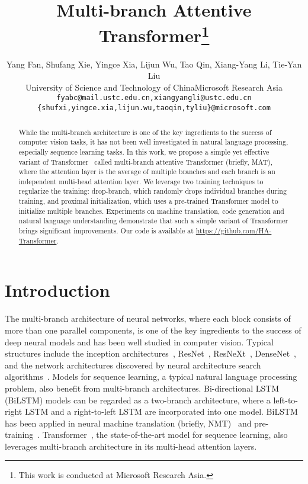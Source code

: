\documentclass{article}
\title{Multi-branch Attentive Transformer\thanks{This work is conducted at Microsoft Research Asia.}}
\author{Yang Fan, Shufang Xie, Yingce Xia, Lijun Wu, Tao Qin, Xiang{-}Yang Li, Tie{-}Yan Liu\\
 University of Science and Technology of China\quad Microsoft Research Asia\\
  \texttt{fyabc@mail.ustc.edu.cn,\;xiangyangli@ustc.edu.cn}\\\quad\texttt{\{shufxi,yingce.xia,lijun.wu,taoqin,tyliu\}@microsoft.com} \\
}
\begin{document}
\maketitle

\begin{abstract}
While the multi-branch architecture is one of the key ingredients to the success of computer vision tasks, it has not been well investigated in natural language processing, especially sequence learning tasks. In this work, we propose a simple yet effective variant of Transformer~\cite{vaswani2017attention} called multi-branch attentive Transformer (briefly, MAT), where the attention layer is the average of multiple branches and each branch is an independent multi-head attention layer. We leverage two training techniques to regularize the training: drop-branch, which randomly drops individual branches during training, and proximal initialization, which uses a pre-trained Transformer model to initialize multiple branches. Experiments on machine translation, code generation and natural language understanding demonstrate that such a simple variant of Transformer brings significant improvements. Our code is available at  \url{https://github.com/HA-Transformer}.
\end{abstract}

\section{Introduction}\label{sec:intro}
The multi-branch architecture of neural networks, where each block consists of more than one parallel components, is one of the key ingredients to the success of deep neural models and has been well studied in computer vision.
Typical structures include the inception architectures~\cite{szegedy2015going,szegedy2016rethinking,szegedy2017inception}, ResNet~\cite{he2016deep}, ResNeXt~\cite{xie2017aggregated}, DenseNet~\cite{huang2017densely}, and the network architectures discovered by neural architecture search algorithms~\cite{pham2018efficient,liu2019darts}. Models for sequence learning, a typical natural language processing problem, also benefit from multi-branch architectures. Bi-directional LSTM (BiLSTM) models can be regarded as a two-branch architecture, where a left-to-right LSTM and a right-to-left LSTM are incorporated into one model. BiLSTM has been applied in neural machine translation (briefly, NMT)~\cite{zhou2016deep,wu2016google} and pre-training~\cite{peters2018elmo}. Transformer~\cite{vaswani2017attention}, the state-of-the-art model for sequence learning, also leverages multi-branch architecture in its multi-head attention layers. 
\end{document}
